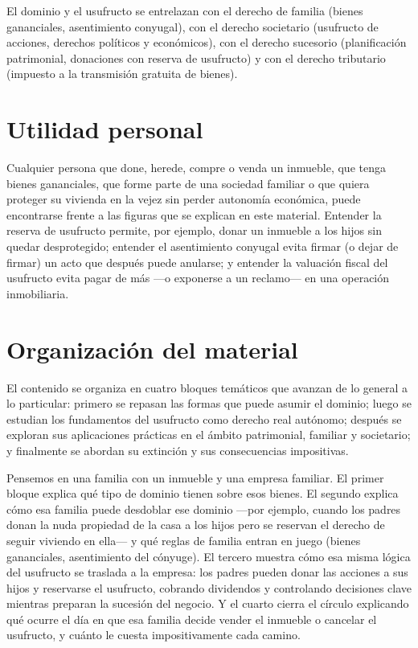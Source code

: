 \documentclass[12pt,oneside]{book}
\begin{document}
El dominio y el usufructo se entrelazan con el derecho de familia (bienes gananciales, asentimiento conyugal), con el derecho societario (usufructo de acciones, derechos políticos y económicos), con el derecho sucesorio (planificación patrimonial, donaciones con reserva de usufructo) y con el derecho tributario (impuesto a la transmisión gratuita de bienes).

\section*{Utilidad personal}

Cualquier persona que done, herede, compre o venda un inmueble, que tenga bienes gananciales, que forme parte de una sociedad familiar o que quiera proteger su vivienda en la vejez sin perder autonomía económica, puede encontrarse frente a las figuras que se explican en este material. Entender la reserva de usufructo permite, por ejemplo, donar un inmueble a los hijos sin quedar desprotegido; entender el asentimiento conyugal evita firmar (o dejar de firmar) un acto que después puede anularse; y entender la valuación fiscal del usufructo evita pagar de más ---o exponerse a un reclamo--- en una operación inmobiliaria.

\section*{Organización del material}

El contenido se organiza en cuatro bloques temáticos que avanzan de lo general a lo particular: primero se repasan las formas que puede asumir el dominio; luego se estudian los fundamentos del usufructo como derecho real autónomo; después se exploran sus aplicaciones prácticas en el ámbito patrimonial, familiar y societario; y finalmente se abordan su extinción y sus consecuencias impositivas.

Pensemos en una familia con un inmueble y una empresa familiar. El primer bloque explica qué tipo de dominio tienen sobre esos bienes. El segundo explica cómo esa familia puede desdoblar ese dominio ---por ejemplo, cuando los padres donan la nuda propiedad de la casa a los hijos pero se reservan el derecho de seguir viviendo en ella--- y qué reglas de familia entran en juego (bienes gananciales, asentimiento del cónyuge). El tercero muestra cómo esa misma lógica del usufructo se traslada a la empresa: los padres pueden donar las acciones a sus hijos y reservarse el usufructo, cobrando dividendos y controlando decisiones clave mientras preparan la sucesión del negocio. Y el cuarto cierra el círculo explicando qué ocurre el día en que esa familia decide vender el inmueble o cancelar el usufructo, y cuánto le cuesta impositivamente cada camino.
\end{document}
